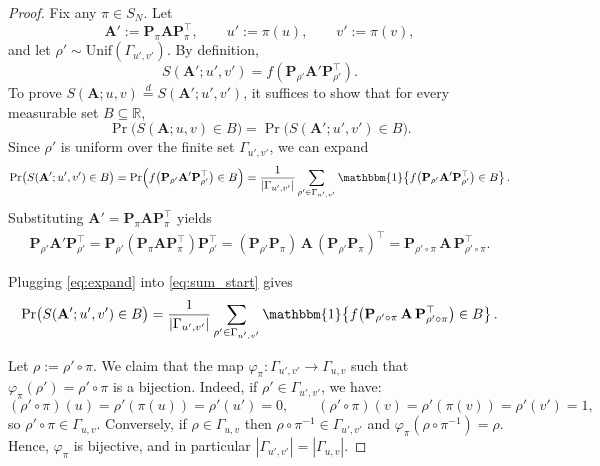 \documentclass{article}
\theoremstyle{plain}
\theoremstyle{definition}
\theoremstyle{remark}
\begin{document}
\begin{proof}
    Fix any $\pi\in S_N$. Let
    \[
    \mathbf{A}' := \mathbf{P}_\pi \mathbf{A} \mathbf{P}_\pi^\top,\qquad u' := \pi(u),\qquad v' := \pi(v),
    \]
    and let $\rho' \sim \mathrm{Unif}(\Gamma_{u',v'})$. By definition,
    \[
    S(\mathbf{A}';u',v') = f\!\left(\mathbf{P}_{\rho'} \mathbf{A}' \mathbf{P}_{\rho'}^\top\right).
    \]
    To prove $S(\mathbf{A};u,v)\overset{d}{=}S(\mathbf{A}';u',v')$, it suffices to show that for every measurable set $B\subseteq\mathbb{R}$,
    \[
    \Pr\!\big(S(\mathbf{A};u,v)\in B\big)=\Pr\!\big(S(\mathbf{A}';u',v')\in B\big).
    \]
    Since $\rho'$ is uniform over the finite set $\Gamma_{u',v'}$, we can expand
    \begin{align}
    \Pr\!\big(S(\mathbf{A}';u',v')\in B\big)
    = \Pr\!\Big(f\!\left(\mathbf{P}_{\rho'} \mathbf{A}' \mathbf{P}_{\rho'}^\top\right)\in B\Big) = \frac{1}{|\Gamma_{u',v'}|}\sum_{\rho'\in\Gamma_{u',v'}}
    \mathbbm{1}\!\left\{ f\!\left(\mathbf{P}_{\rho'} \mathbf{A}' \mathbf{P}_{\rho'}^\top\right)\in B \right\}. \label{eq:sum_start}
    \end{align}
    Substituting $\mathbf{A}' = \mathbf{P}_\pi \mathbf{A} \mathbf{P}_\pi^\top$ yields
    \begin{align}
    \mathbf{P}_{\rho'} \mathbf{A}' \mathbf{P}_{\rho'}^\top
    = \mathbf{P}_{\rho'} (\mathbf{P}_\pi \mathbf{A} \mathbf{P}_\pi^\top) \mathbf{P}_{\rho'}^\top
    = (\mathbf{P}_{\rho'}\mathbf{P}_\pi)\, \mathbf{A}\, (\mathbf{P}_{\rho'}\mathbf{P}_\pi)^\top = \mathbf{P}_{\rho'\circ\pi}\, \mathbf{A}\, \mathbf{P}_{\rho'\circ\pi}^\top. \label{eq:expand}
    \end{align}

    Plugging \eqref{eq:expand} into \eqref{eq:sum_start} gives
    \begin{equation}
    \Pr\!\big(S(\mathbf{A}';u',v')\in B\big)
    = \frac{1}{|\Gamma_{u',v'}|}\sum_{\rho'\in\Gamma_{u',v'}}
    \mathbbm{1}\!\left\{ f\!\left(\mathbf{P}_{\rho'\circ\pi}\, \mathbf{A}\, \mathbf{P}_{\rho'\circ\pi}^\top\right)\in B \right\}. \label{eq:sum_mid}
    \end{equation}
    
    Let $\rho := \rho'\circ\pi$. We claim that the map \(
    \varphi_\pi:\Gamma_{u',v'}\to\Gamma_{u,v}\) such that \( \varphi_\pi(\rho')=\rho'\circ\pi\)
    is a bijection. Indeed, if $\rho'\in\Gamma_{u',v'}$, we have:
    \[
    (\rho'\circ\pi)(u)=\rho'(\pi(u))=\rho'(u')=0,\qquad
    (\rho'\circ\pi)(v)=\rho'(\pi(v))=\rho'(v')=1,
    \]
    so $\rho'\circ\pi\in\Gamma_{u,v}$. Conversely, if $\rho\in\Gamma_{u,v}$ then $\rho\circ\pi^{-1}\in\Gamma_{u',v'}$ and
    $\varphi_\pi(\rho\circ\pi^{-1})=\rho$. Hence, $\varphi_\pi$ is bijective, and in particular
    $|\Gamma_{u',v'}|=|\Gamma_{u,v}|$.
    

\end{proof}
\end{document}
